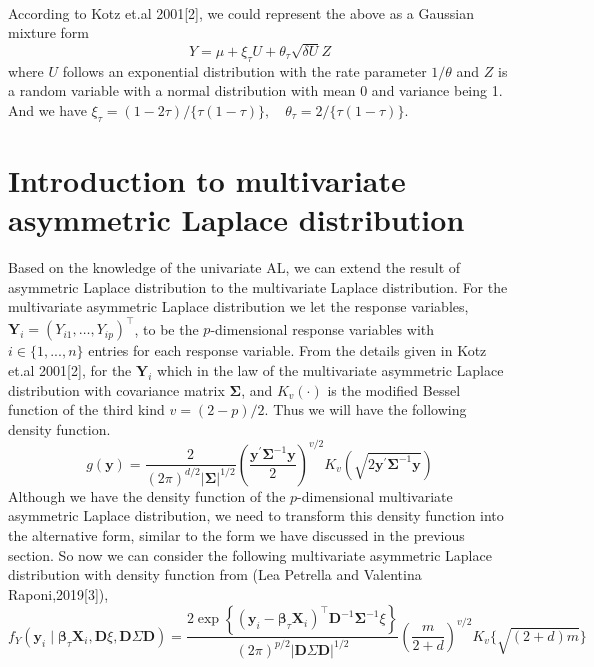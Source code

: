 \documentclass[mstat,12pt]{unswthesis}  %
\numberwithin{equation}{section}
\begin{document}
\\
According to Kotz et.al 2001[2], we could represent the above as a Gaussian mixture form
\begin{equation*}
    Y=\mu+\xi_{\tau} U+\theta_{\tau} \sqrt{\delta U}Z
\end{equation*}
where $U$ follows an exponential distribution with the rate parameter $1/\theta$ and $Z$ is a random variable with a normal distribution with mean 0 and variance being 1. And we have $\xi_{\tau}=(1-2 \tau) /\{\tau(1-\tau)\}, \quad \theta_{\tau}=2 /\{\tau(1-\tau)\}$.

\section{Introduction to multivariate asymmetric Laplace distribution}
Based on the knowledge of the univariate AL, we can extend the result of asymmetric Laplace distribution to the multivariate Laplace distribution. For the multivariate asymmetric Laplace distribution we let the response variables, $\boldsymbol{Y}_{i}=\left(Y_{i 1}, \ldots, Y_{i p}\right)^{\top}$, to be the $p$-dimensional response variables with $i \in \{1,...,n\}$
entries for each response variable. From the details given in Kotz et.al 2001[2], for the $\boldsymbol{Y}_{i}$ which in the law of the multivariate asymmetric Laplace distribution with covariance matrix $\mathbf{\Sigma}$, and $K_{v}(\cdot)$ is the modified Bessel function of the third kind $v=(2-p)/2$. Thus we will have the following density function.
\begin{equation}
    g(\mathbf{y})=\frac{2}{(2 \pi)^{d / 2}|\mathbf{\Sigma}|^{1 / 2}}\left(\frac{\mathbf{y}^{\prime} \mathbf{\Sigma}^{-1} \mathbf{y}}{2}\right)^{v / 2} K_{v}\left(\sqrt{2 \mathbf{y}^{\prime} \mathbf{\Sigma}^{-1} \mathbf{y}}\right)
\end{equation}
Although we have the density function of the $p$-dimensional multivariate asymmetric Laplace distribution, we need to transform this density function into the alternative form, similar to the form we have discussed in the previous section. So now we can consider the following multivariate asymmetric Laplace distribution with density function from (Lea Petrella and Valentina Raponi,2019[3]),
\begin{equation}
    f_{Y}\left(\boldsymbol{y}_{i} \mid \boldsymbol{\beta}_{\tau} \boldsymbol{X}_{i}, \boldsymbol{D} {\xi}, \boldsymbol{D} {\Sigma} \boldsymbol{D}\right)=\frac{2 \exp \left\{\left(\boldsymbol{y}_{i}-\boldsymbol{\beta}_{\tau} \boldsymbol{X}_{i}\right)^{\top} \boldsymbol{D}^{-1} {\boldsymbol{\Sigma}}^{-1} {\xi}\right\}}{(2 \pi)^{p / 2}|\boldsymbol{D} {\Sigma} \boldsymbol{D}|^{1 / 2}}\left(\frac{{m}}{2+{d}}\right)^{v / 2} K_{v}\{\sqrt{(2+{d}) {m}}\}
\end{equation}
\end{document}
